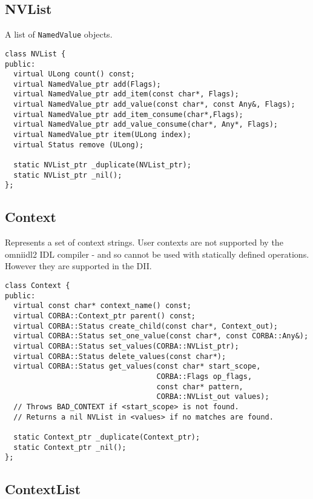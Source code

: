 \documentclass[11pt,twoside,onecolumn]{book}
\begin{document}
\subsection{NVList}

A list of {\tt NamedValue} objects.

{\small \begin{verbatim}
class NVList {
public:
  virtual ULong count() const;
  virtual NamedValue_ptr add(Flags);
  virtual NamedValue_ptr add_item(const char*, Flags);
  virtual NamedValue_ptr add_value(const char*, const Any&, Flags);
  virtual NamedValue_ptr add_item_consume(char*,Flags);
  virtual NamedValue_ptr add_value_consume(char*, Any*, Flags);
  virtual NamedValue_ptr item(ULong index);
  virtual Status remove (ULong);

  static NVList_ptr _duplicate(NVList_ptr);
  static NVList_ptr _nil();
};
\end{verbatim}}


\subsection{Context}

Represents a set of context strings. User contexts are not supported by
the omniidl2 IDL compiler - and so cannot be used with statically defined
operations. However they are supported in the DII.

{\small \begin{verbatim}
class Context {
public:
  virtual const char* context_name() const;
  virtual CORBA::Context_ptr parent() const;
  virtual CORBA::Status create_child(const char*, Context_out);
  virtual CORBA::Status set_one_value(const char*, const CORBA::Any&);
  virtual CORBA::Status set_values(CORBA::NVList_ptr);
  virtual CORBA::Status delete_values(const char*);
  virtual CORBA::Status get_values(const char* start_scope,
                                   CORBA::Flags op_flags,
                                   const char* pattern,
                                   CORBA::NVList_out values);
  // Throws BAD_CONTEXT if <start_scope> is not found.
  // Returns a nil NVList in <values> if no matches are found.

  static Context_ptr _duplicate(Context_ptr);
  static Context_ptr _nil();
};
\end{verbatim}}


\subsection{ContextList}
\end{document}
